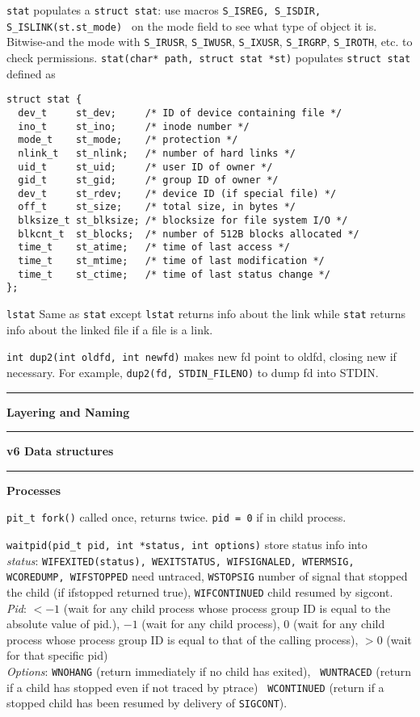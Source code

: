 \documentclass{article}
\begin{document}
\begin{multicols}{2}
  {\tt stat} populates a {\tt struct stat}: use macros
  {\tt S\_ISREG, S\_ISDIR, S\_ISLINK(st.st\_mode) } on the mode field to see
  what type of object it is. Bitwise-and the mode with \texttt{S\_IRUSR},
  \texttt{S\_IWUSR}, \texttt{S\_IXUSR}, \texttt{S\_IRGRP}, \texttt{S\_IROTH},
  etc. to check permissions.
  {\tt stat(char* path, struct stat *st)} populates \texttt{struct stat} defined
  as
  {\footnotesize
  \begin{verbatim}
struct stat {
  dev_t     st_dev;     /* ID of device containing file */
  ino_t     st_ino;     /* inode number */
  mode_t    st_mode;    /* protection */
  nlink_t   st_nlink;   /* number of hard links */
  uid_t     st_uid;     /* user ID of owner */
  gid_t     st_gid;     /* group ID of owner */
  dev_t     st_rdev;    /* device ID (if special file) */
  off_t     st_size;    /* total size, in bytes */
  blksize_t st_blksize; /* blocksize for file system I/O */
  blkcnt_t  st_blocks;  /* number of 512B blocks allocated */
  time_t    st_atime;   /* time of last access */
  time_t    st_mtime;   /* time of last modification */
  time_t    st_ctime;   /* time of last status change */
}; \end{verbatim}}
  {\tt lstat} Same as {\tt stat} except {\tt lstat} returns info about the
  link while {\tt stat} returns info about the linked file if a file is a link.

  {\tt int dup2(int oldfd, int newfd)} makes new fd point to oldfd, closing new
  if necessary. For example, {\tt dup2(fd, STDIN\_FILENO)} to dump fd into STDIN.

  \noindent\rule{4cm}{0.4pt}

  {\bf Layering and Naming}

  \noindent\rule{4cm}{0.4pt}

  {\bf v6 Data structures}

  \noindent\rule{4cm}{0.4pt}

  {\bf Processes}

  {\tt pit\_t fork()} called once, returns twice. {\tt pid = 0} if in child
  process.

  {\tt waitpid(pid\_t pid, int *status, int options)} store status info into\\
  {\it status}: {\tt WIFEXITED(status), WEXITSTATUS, WIFSIGNALED, WTERMSIG,
  WCOREDUMP, WIFSTOPPED} need untraced, {\tt WSTOPSIG} number of signal that
  stopped the child (if ifstopped returned true), {\tt WIFCONTINUED} child
  resumed by
  sigcont.\\
  {\it Pid}: $<-1$ (wait for any child process whose process group ID is equal to the
  absolute value of pid.), $-1$ (wait for any child process), $0$ (wait for any
  child process whose process group ID is equal to that of the calling process),
  $>0$ (wait for that specific pid)\\
  {\it Options}: {\tt WNOHANG} (return immediately if no child has exited), {\tt
  WUNTRACED} (return if a child has stopped even if not traced by ptrace) {\tt
  WCONTINUED} (return if a stopped child has been resumed by delivery of
  \texttt{SIGCONT}).


\end{multicols}
\end{document}
